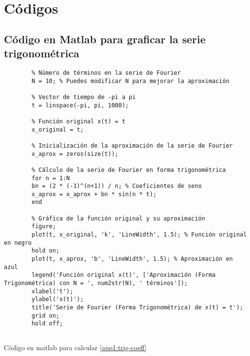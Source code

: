\chapter{Códigos}\label{app2:Estado-del-arte-codes}

\section{Código en Matlab para graficar la serie trigonométrica}\label{app2:trig-code-matlab}
\begin{longlisting}
	\begin{verbatim}
		% Número de términos en la serie de Fourier
		N = 10; % Puedes modificar N para mejorar la aproximación
		
		% Vector de tiempo de -pi a pi
		t = linspace(-pi, pi, 1000);
		
		% Función original x(t) = t
		x_original = t;
		
		% Inicialización de la aproximación de la serie de Fourier
		x_aprox = zeros(size(t));
		
		% Cálculo de la serie de Fourier en forma trigonométrica
		for n = 1:N
		bn = (2 * (-1)^(n+1)) / n; % Coeficientes de seno
		x_aprox = x_aprox + bn * sin(n * t);
		end
		
		% Gráfica de la función original y su aproximación
		figure;
		plot(t, x_original, 'k', 'LineWidth', 1.5); % Función original en negro
		hold on;
		plot(t, x_aprox, 'b', 'LineWidth', 1.5); % Aproximación en azul
		legend('Función original x(t)', ['Aproximación (Forma Trigonométrica) con N = ', num2str(N), ' términos']);
		xlabel('t');
		ylabel('x(t)');
		title('Serie de Fourier (Forma Trigonométrica) de x(t) = t');
		grid on;
		hold off;
		
	\end{verbatim}
	\caption{Código en matlab para calcular \ref{app1:trig-coeff}}
\end{longlisting}

